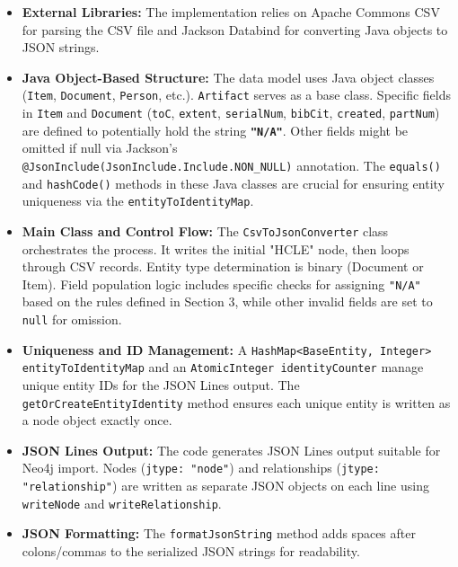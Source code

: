 \documentclass[11pt, a4paper]{article}
\begin{document}
\begin{itemize}
    \item \textbf{External Libraries:} The implementation relies on Apache Commons CSV for parsing the CSV file and Jackson Databind for converting Java objects to JSON strings.

    \item \textbf{Java Object-Based Structure:} The data model uses Java object classes (\texttt{Item}, \texttt{Document}, \texttt{Person}, etc.). \texttt{Artifact} serves as a base class. Specific fields in \texttt{Item} and \texttt{Document} (\texttt{toC}, \texttt{extent}, \texttt{serialNum}, \texttt{bibCit}, \texttt{created}, \texttt{partNum}) are defined to potentially hold the string \textbf{\texttt{"N/A"}}. Other fields might be omitted if null via Jackson's \\
    \texttt{@JsonInclude(JsonInclude.Include.NON\_NULL)} annotation. The \texttt{equals()} and \texttt{hashCode()} methods in these Java classes are crucial for ensuring entity uniqueness via the \texttt{entityToIdentityMap}.

    \item \textbf{Main Class and Control Flow:} The \texttt{CsvToJsonConverter} class orchestrates the process. It writes the initial "HCLE" node, then loops through CSV records. Entity type determination is binary (Document or Item). Field population logic includes specific checks for assigning \texttt{"N/A"} based on the rules defined in Section 3, while other invalid fields are set to \texttt{null} for omission.

    \item \textbf{Uniqueness and ID Management:} A \texttt{HashMap<BaseEntity, Integer> entityToIdentityMap} and an \texttt{AtomicInteger identityCounter} manage unique entity IDs for the JSON Lines output. The \texttt{getOrCreateEntityIdentity} method ensures each unique entity is written as a node object exactly once.

    \item \textbf{JSON Lines Output:} The code generates JSON Lines output suitable for Neo4j import. Nodes (\texttt{jtype: "node"}) and relationships (\texttt{jtype: "relationship"}) are written as separate JSON objects on each line using \texttt{writeNode} and \texttt{writeRelationship}.

    \item \textbf{JSON Formatting:} The \texttt{formatJsonString} method adds spaces after colons/commas to the serialized JSON strings for readability.


\end{itemize}
\end{document}
